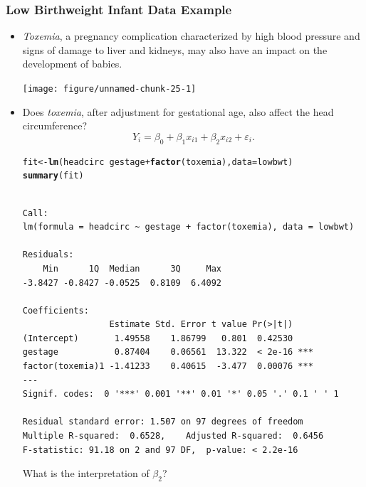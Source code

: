 \documentclass{article}\usepackage[]{graphicx}\usepackage[svgnames]{xcolor}
\makeatletter
\newcommand{\hlopt}[1]{\textcolor[rgb]{0,0,0}{#1}}%
\newcommand{\hlstd}[1]{\textcolor[rgb]{0.345,0.345,0.345}{#1}}%
\newcommand{\hlkwb}[1]{\textcolor[rgb]{0.69,0.353,0.396}{#1}}%
\newcommand{\hlkwc}[1]{\textcolor[rgb]{0.333,0.667,0.333}{#1}}%
\newcommand{\hlkwd}[1]{\textcolor[rgb]{0.737,0.353,0.396}{\textbf{#1}}}%
\newenvironment{kframe}{%
 \def\at@end@of@kframe{}%
 \ifinner\ifhmode%
  \def\at@end@of@kframe{\end{minipage}}%
  \begin{minipage}{\columnwidth}%
 \fi\fi%
 \def\FrameCommand##1{\hskip\@totalleftmargin \hskip-\fboxsep
 \colorbox{shadecolor}{##1}\hskip-\fboxsep
     \hskip-\linewidth \hskip-\@totalleftmargin \hskip\columnwidth}%
 \MakeFramed {\advance\hsize-\width
   \@totalleftmargin\z@ \linewidth\hsize
   \@setminipage}}%
 {\par\unskip\endMakeFramed%
 \at@end@of@kframe}
\newenvironment{knitrout}{}{} %
\makeatother
\begin{document}
\subsubsection*{Low Birthweight Infant Data Example}
\begin{itemize}
      \item \emph{Toxemia}, a pregnancy complication characterized by high blood pressure
            and signs of damage to liver and kidneys, may also have an impact on the
            development of babies.
\begin{knitrout}
\color{fgcolor}

{\centering \texttt{[image: figure/unnamed-chunk-25-1]} 

}


\end{knitrout}
      \item Does \emph{toxemia}, after adjustment for gestational age, also affect the head
            circumference?
            \[ Y_i=\beta_0+\beta_1x_{i1}+\beta_2x_{i2}+\varepsilon_i. \]
\begin{knitrout}
\color{fgcolor}\begin{kframe}
\begin{alltt}
\hlstd{fit} \hlkwb{<-} \hlkwd{lm}\hlstd{(headcirc} \hlopt{~} \hlstd{gestage} \hlopt{+} \hlkwd{factor}\hlstd{(toxemia),} \hlkwc{data} \hlstd{= lowbwt)}
\hlkwd{summary}\hlstd{(fit)}
\end{alltt}
\begin{verbatim}

Call:
lm(formula = headcirc ~ gestage + factor(toxemia), data = lowbwt)

Residuals:
    Min      1Q  Median      3Q     Max 
-3.8427 -0.8427 -0.0525  0.8109  6.4092 

Coefficients:
                 Estimate Std. Error t value Pr(>|t|)    
(Intercept)       1.49558    1.86799   0.801  0.42530    
gestage           0.87404    0.06561  13.322  < 2e-16 ***
factor(toxemia)1 -1.41233    0.40615  -3.477  0.00076 ***
---
Signif. codes:  0 '***' 0.001 '**' 0.01 '*' 0.05 '.' 0.1 ' ' 1

Residual standard error: 1.507 on 97 degrees of freedom
Multiple R-squared:  0.6528,	Adjusted R-squared:  0.6456 
F-statistic: 91.18 on 2 and 97 DF,  p-value: < 2.2e-16
\end{verbatim}
\end{kframe}
\end{knitrout}
            What is the interpretation of $ \beta_2 $?


\end{itemize}
\end{document}
